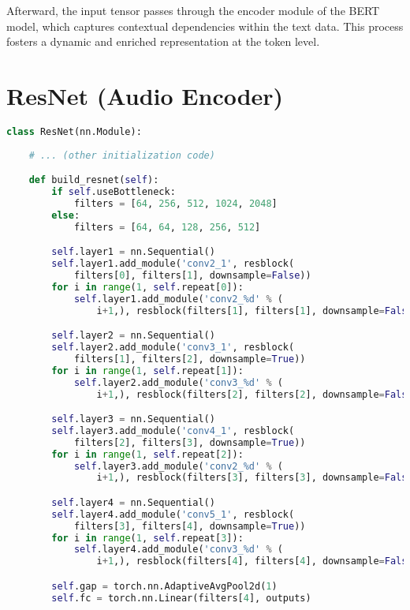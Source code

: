 Afterward, the input tensor passes through the encoder module of the BERT model, which captures contextual dependencies within the text data. This process fosters a dynamic and enriched representation at the token level.

\section{ResNet (Audio Encoder)}

\begin{lstlisting}[language=Python, caption={Residual Network (ResNet) architecture for audio processing with custom residual block implementation.}]
class ResNet(nn.Module):
  
    # ... (other initialization code)

    def build_resnet(self):
        if self.useBottleneck:
            filters = [64, 256, 512, 1024, 2048]
        else:
            filters = [64, 64, 128, 256, 512]

        self.layer1 = nn.Sequential()
        self.layer1.add_module('conv2_1', resblock(
            filters[0], filters[1], downsample=False))
        for i in range(1, self.repeat[0]):
            self.layer1.add_module('conv2_%d' % (
                i+1,), resblock(filters[1], filters[1], downsample=False))

        self.layer2 = nn.Sequential()
        self.layer2.add_module('conv3_1', resblock(
            filters[1], filters[2], downsample=True))
        for i in range(1, self.repeat[1]):
            self.layer2.add_module('conv3_%d' % (
                i+1,), resblock(filters[2], filters[2], downsample=False))

        self.layer3 = nn.Sequential()
        self.layer3.add_module('conv4_1', resblock(
            filters[2], filters[3], downsample=True))
        for i in range(1, self.repeat[2]):
            self.layer3.add_module('conv2_%d' % (
                i+1,), resblock(filters[3], filters[3], downsample=False))

        self.layer4 = nn.Sequential()
        self.layer4.add_module('conv5_1', resblock(
            filters[3], filters[4], downsample=True))
        for i in range(1, self.repeat[3]):
            self.layer4.add_module('conv3_%d' % (
                i+1,), resblock(filters[4], filters[4], downsample=False))

        self.gap = torch.nn.AdaptiveAvgPool2d(1)
        self.fc = torch.nn.Linear(filters[4], outputs)


\end{lstlisting}
